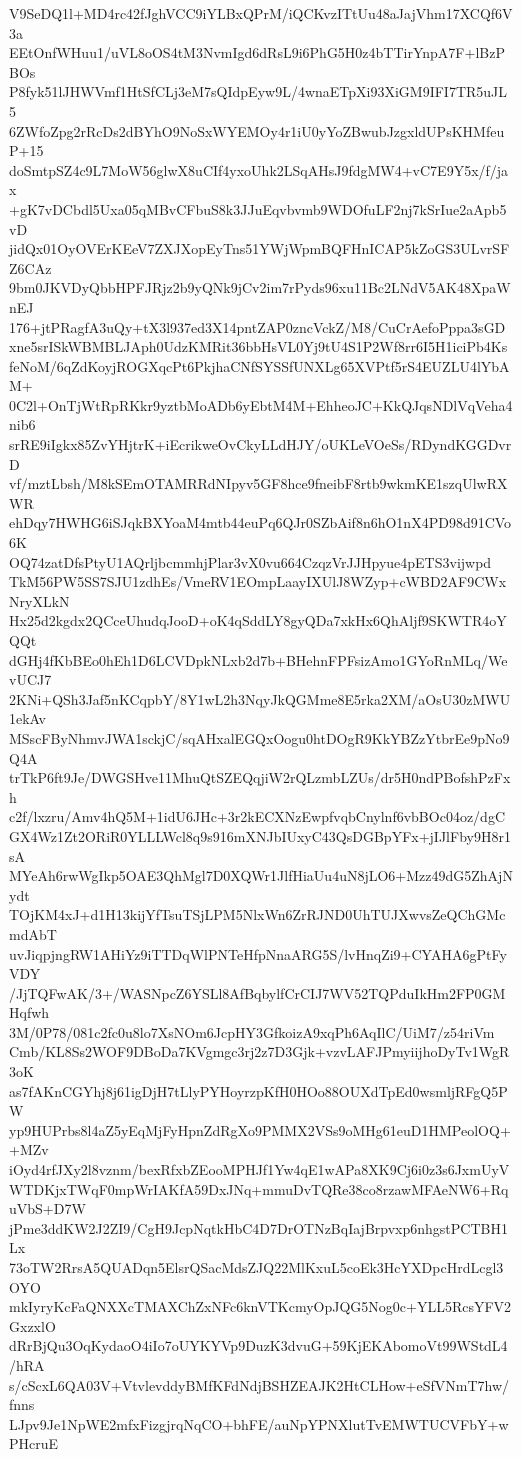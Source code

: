 V9SeDQ1l+MD4rc42fJghVCC9iYLBxQPrM/iQCKvzITtUu48aJajVhm17XCQf6V3a
EEtOnfWHuu1/uVL8oOS4tM3NvmIgd6dRsL9i6PhG5H0z4bTTirYnpA7F+lBzPBOs
P8fyk51lJHWVmf1HtSfCLj3eM7sQIdpEyw9L/4wnaETpXi93XiGM9IFI7TR5uJL5
6ZWfoZpg2rRcDs2dBYhO9NoSxWYEMOy4r1iU0yYoZBwubJzgxldUPsKHMfeuP+15
doSmtpSZ4c9L7MoW56glwX8uCIf4yxoUhk2LSqAHsJ9fdgMW4+vC7E9Y5x/f/jax
+gK7vDCbdl5Uxa05qMBvCFbuS8k3JJuEqvbvmb9WDOfuLF2nj7kSrIue2aApb5vD
jidQx01OyOVErKEeV7ZXJXopEyTns51YWjWpmBQFHnICAP5kZoGS3ULvrSFZ6CAz
9bm0JKVDyQbbHPFJRjz2b9yQNk9jCv2im7rPyds96xu11Bc2LNdV5AK48XpaWnEJ
176+jtPRagfA3uQy+tX3l937ed3X14pntZAP0zncVckZ/M8/CuCrAefoPppa3sGD
xne5srISkWBMBLJAph0UdzKMRit36bbHsVL0Yj9tU4S1P2Wf8rr6I5H1iciPb4Ks
feNoM/6qZdKoyjROGXqcPt6PkjhaCNfSYSSfUNXLg65XVPtf5rS4EUZLU4lYbAM+
0C2l+OnTjWtRpRKkr9yztbMoADb6yEbtM4M+EhheoJC+KkQJqsNDlVqVeha4nib6
srRE9iIgkx85ZvYHjtrK+iEcrikweOvCkyLLdHJY/oUKLeVOeSs/RDyndKGGDvrD
vf/mztLbsh/M8kSEmOTAMRRdNIpyv5GF8hce9fneibF8rtb9wkmKE1szqUlwRXWR
ehDqy7HWHG6iSJqkBXYoaM4mtb44euPq6QJr0SZbAif8n6hO1nX4PD98d91CVo6K
OQ74zatDfsPtyU1AQrljbcmmhjPlar3vX0vu664CzqzVrJJHpyue4pETS3vijwpd
TkM56PW5SS7SJU1zdhEs/VmeRV1EOmpLaayIXUlJ8WZyp+cWBD2AF9CWxNryXLkN
Hx25d2kgdx2QCceUhudqJooD+oK4qSddLY8gyQDa7xkHx6QhAljf9SKWTR4oYQQt
dGHj4fKbBEo0hEh1D6LCVDpkNLxb2d7b+BHehnFPFsizAmo1GYoRnMLq/WevUCJ7
2KNi+QSh3Jaf5nKCqpbY/8Y1wL2h3NqyJkQGMme8E5rka2XM/aOsU30zMWU1ekAv
MSscFByNhmvJWA1sckjC/sqAHxalEGQxOogu0htDOgR9KkYBZzYtbrEe9pNo9Q4A
trTkP6ft9Je/DWGSHve11MhuQtSZEQqjiW2rQLzmbLZUs/dr5H0ndPBofshPzFxh
c2f/lxzru/Amv4hQ5M+1idU6JHc+3r2kECXNzEwpfvqbCnylnf6vbBOc04oz/dgC
GX4Wz1Zt2ORiR0YLLLWcl8q9s916mXNJbIUxyC43QsDGBpYFx+jIJlFby9H8r1sA
MYeAh6rwWgIkp5OAE3QhMgl7D0XQWr1JlfHiaUu4uN8jLO6+Mzz49dG5ZhAjNydt
TOjKM4xJ+d1H13kijYfTsuTSjLPM5NlxWn6ZrRJND0UhTUJXwvsZeQChGMcmdAbT
uvJiqpjngRW1AHiYz9iTTDqWlPNTeHfpNnaARG5S/lvHnqZi9+CYAHA6gPtFyVDY
/JjTQFwAK/3+/WASNpcZ6YSLl8AfBqbylfCrCIJ7WV52TQPduIkHm2FP0GMHqfwh
3M/0P78/081c2fc0u8lo7XsNOm6JcpHY3GfkoizA9xqPh6AqIlC/UiM7/z54riVm
Cmb/KL8Ss2WOF9DBoDa7KVgmgc3rj2z7D3Gjk+vzvLAFJPmyiijhoDyTv1WgR3oK
as7fAKnCGYhj8j61igDjH7tLlyPYHoyrzpKfH0HOo88OUXdTpEd0wsmljRFgQ5PW
yp9HUPrbs8l4aZ5yEqMjFyHpnZdRgXo9PMMX2VSs9oMHg61euD1HMPeolOQ++MZv
iOyd4rfJXy2l8vznm/bexRfxbZEooMPHJf1Yw4qE1wAPa8XK9Cj6i0z3s6JxmUyV
WTDKjxTWqF0mpWrIAKfA59DxJNq+mmuDvTQRe38co8rzawMFAeNW6+RquVbS+D7W
jPme3ddKW2J2ZI9/CgH9JcpNqtkHbC4D7DrOTNzBqIajBrpvxp6nhgstPCTBH1Lx
73oTW2RrsA5QUADqn5ElsrQSacMdsZJQ22MlKxuL5coEk3HcYXDpcHrdLcgl3OYO
mkIyryKcFaQNXXcTMAXChZxNFc6knVTKcmyOpJQG5Nog0c+YLL5RcsYFV2GxzxlO
dRrBjQu3OqKydaoO4iIo7oUYKYVp9DuzK3dvuG+59KjEKAbomoVt99WStdL4/hRA
s/cScxL6QA03V+VtvlevddyBMfKFdNdjBSHZEAJK2HtCLHow+eSfVNmT7hw/fnns
LJpv9Je1NpWE2mfxFizgjrqNqCO+bhFE/auNpYPNXlutTvEMWTUCVFbY+wPHcruE
